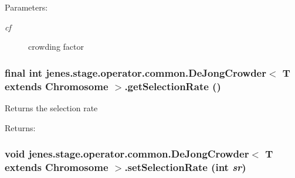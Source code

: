 \begin{Desc}
\item[Parameters:]
\begin{description}
\item[{\em cf}]crowding factor \end{description}
\end{Desc}
\hypertarget{classjenes_1_1stage_1_1operator_1_1common_1_1_de_jong_crowder_3_01_t_01extends_01_chromosome_01_4_eae8a98bdc6da2261e6071ca62c5a066}{
\subsubsection[getSelectionRate]{\setlength{\rightskip}{0pt plus 5cm}final int jenes.stage.operator.common.DeJongCrowder$<$ T extends Chromosome $>$.getSelectionRate ()}}
\label{classjenes_1_1stage_1_1operator_1_1common_1_1_de_jong_crowder_3_01_t_01extends_01_chromosome_01_4_eae8a98bdc6da2261e6071ca62c5a066}


Returns the selection rate

\begin{Desc}
\item[Returns:]\end{Desc}
\hypertarget{classjenes_1_1stage_1_1operator_1_1common_1_1_de_jong_crowder_3_01_t_01extends_01_chromosome_01_4_4d1a71c514bb8ffaeba9a13434dc3635}{
\subsubsection[setSelectionRate]{\setlength{\rightskip}{0pt plus 5cm}void jenes.stage.operator.common.DeJongCrowder$<$ T extends Chromosome $>$.setSelectionRate (int {\em sr})}}
\label{classjenes_1_1stage_1_1operator_1_1common_1_1_de_jong_crowder_3_01_t_01extends_01_chromosome_01_4_4d1a71c514bb8ffaeba9a13434dc3635}


